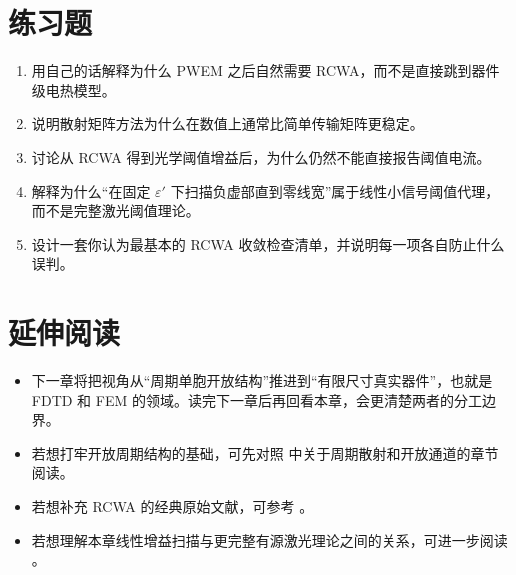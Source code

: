 \section*{练习题}
\begin{enumerate}
  \item \basicq 用自己的话解释为什么 PWEM 之后自然需要 RCWA，而不是直接跳到器件级电热模型。

  \item \basicq 说明散射矩阵方法为什么在数值上通常比简单传输矩阵更稳定。

  \item \midq 讨论从 RCWA 得到光学阈值增益后，为什么仍然不能直接报告阈值电流。

  \item \midq 解释为什么“在固定 $\varepsilon'$ 下扫描负虚部直到零线宽”属于线性小信号阈值代理，而不是完整激光阈值理论。

  \item \hardq 设计一套你认为最基本的 RCWA 收敛检查清单，并说明每一项各自防止什么误判。
\end{enumerate}

\section*{延伸阅读}
\begin{itemize}
  \item 下一章将把视角从“周期单胞开放结构”推进到“有限尺寸真实器件”，也就是 FDTD 和 FEM 的领域。读完下一章后再回看本章，会更清楚两者的分工边界。

  \item 若想打牢开放周期结构的基础，可先对照 \cite{joannopoulos2008,sakoda2005} 中关于周期散射和开放通道的章节阅读。

  \item 若想补充 RCWA 的经典原始文献，可参考 \cite{moharam1981,li1996}。

  \item 若想理解本章线性增益扫描与更完整有源激光理论之间的关系，可进一步阅读 \cite{tureci2007salt,tureci2009salt}。
\end{itemize}
